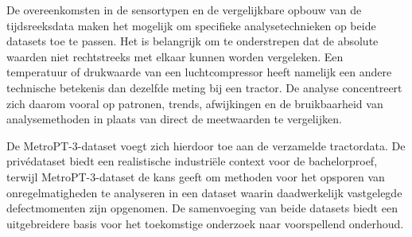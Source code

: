 De overeenkomsten in de sensortypen en de vergelijkbare opbouw van de tijdsreeksdata maken het mogelijk om specifieke analysetechnieken op beide datasets toe te passen. Het is belangrijk om te onderstrepen dat de absolute waarden niet rechtstreeks met elkaar kunnen worden vergeleken. Een temperatuur of drukwaarde van een luchtcompressor heeft namelijk een andere technische betekenis dan dezelfde meting bij een tractor. De analyse concentreert zich daarom vooral op patronen, trends, afwijkingen en de bruikbaarheid van analysemethoden in plaats van direct de meetwaarden te vergelijken.

De MetroPT-3-dataset voegt zich hierdoor toe aan de verzamelde tractordata. De privédataset biedt een realistische industriële context voor de bachelorproef, terwijl MetroPT-3-dataset de kans geeft om methoden voor het opsporen van onregelmatigheden te analyseren in een dataset waarin daadwerkelijk vastgelegde defectmomenten zijn opgenomen. De samenvoeging van beide datasets biedt een uitgebreidere basis voor het toekomstige onderzoek naar voorspellend onderhoud.




